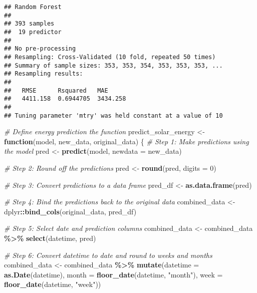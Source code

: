 \documentclass[
]{article}
\newenvironment{Shaded}{\begin{snugshade}}{\end{snugshade}}
\newcommand{\AttributeTok}[1]{\textcolor[rgb]{0.13,0.29,0.53}{#1}}
\newcommand{\CommentTok}[1]{\textcolor[rgb]{0.56,0.35,0.01}{\textit{#1}}}
\newcommand{\ControlFlowTok}[1]{\textcolor[rgb]{0.13,0.29,0.53}{\textbf{#1}}}
\newcommand{\DecValTok}[1]{\textcolor[rgb]{0.00,0.00,0.81}{#1}}
\newcommand{\FunctionTok}[1]{\textcolor[rgb]{0.13,0.29,0.53}{\textbf{#1}}}
\newcommand{\NormalTok}[1]{#1}
\newcommand{\OtherTok}[1]{\textcolor[rgb]{0.56,0.35,0.01}{#1}}
\newcommand{\SpecialCharTok}[1]{\textcolor[rgb]{0.81,0.36,0.00}{\textbf{#1}}}
\newcommand{\StringTok}[1]{\textcolor[rgb]{0.31,0.60,0.02}{#1}}
\begin{document}
\begin{verbatim}
## Random Forest 
## 
## 393 samples
##  19 predictor
## 
## No pre-processing
## Resampling: Cross-Validated (10 fold, repeated 50 times) 
## Summary of sample sizes: 353, 353, 354, 353, 353, 353, ... 
## Resampling results:
## 
##   RMSE      Rsquared   MAE     
##   4411.158  0.6944705  3434.258
## 
## Tuning parameter 'mtry' was held constant at a value of 10
\end{verbatim}

\begin{Shaded}
\begin{Highlighting}[]
\CommentTok{\# Define energy prediction the function}
\NormalTok{predict\_solar\_energy }\OtherTok{\textless{}{-}} \ControlFlowTok{function}\NormalTok{(model, new\_data, original\_data) \{}
  \CommentTok{\# Step 1: Make predictions using the model}
\NormalTok{  pred }\OtherTok{\textless{}{-}} \FunctionTok{predict}\NormalTok{(model, }\AttributeTok{newdata =}\NormalTok{ new\_data)}
  
  \CommentTok{\# Step 2: Round off the predictions}
\NormalTok{  pred }\OtherTok{\textless{}{-}} \FunctionTok{round}\NormalTok{(pred, }\AttributeTok{digits =} \DecValTok{0}\NormalTok{)}
  
  \CommentTok{\# Step 3: Convert predictions to a data frame}
\NormalTok{  pred\_df }\OtherTok{\textless{}{-}} \FunctionTok{as.data.frame}\NormalTok{(pred)}
  
  \CommentTok{\# Step 4: Bind the predictions back to the original data}
\NormalTok{  combined\_data }\OtherTok{\textless{}{-}}\NormalTok{ dplyr}\SpecialCharTok{::}\FunctionTok{bind\_cols}\NormalTok{(original\_data, pred\_df)}
  
  \CommentTok{\# Step 5: Select date and prediction columns}
\NormalTok{  combined\_data }\OtherTok{\textless{}{-}}\NormalTok{ combined\_data }\SpecialCharTok{\%\textgreater{}\%}
    \FunctionTok{select}\NormalTok{(datetime, pred)}
  
  \CommentTok{\# Step 6: Convert datetime to date and round to weeks and months}
\NormalTok{  combined\_data }\OtherTok{\textless{}{-}}\NormalTok{ combined\_data }\SpecialCharTok{\%\textgreater{}\%}
    \FunctionTok{mutate}\NormalTok{(}\AttributeTok{datetime =} \FunctionTok{as.Date}\NormalTok{(datetime),}
           \AttributeTok{month =} \FunctionTok{floor\_date}\NormalTok{(datetime, }\StringTok{"month"}\NormalTok{),}
           \AttributeTok{week =} \FunctionTok{floor\_date}\NormalTok{(datetime, }\StringTok{"week"}\NormalTok{))}
  

\end{Highlighting}
\end{Shaded}
\end{document}
